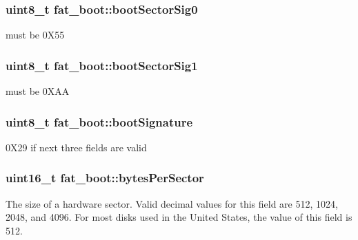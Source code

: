 \subsubsection[{\texorpdfstring{boot\+Sector\+Sig0}{bootSectorSig0}}]{\setlength{\rightskip}{0pt plus 5cm}uint8\+\_\+t fat\+\_\+boot\+::boot\+Sector\+Sig0}\hypertarget{structfat__boot_a7951b888af4f357b84dd40af2ef7f29d}{}\label{structfat__boot_a7951b888af4f357b84dd40af2ef7f29d}
must be 0\+X55 
\subsubsection[{\texorpdfstring{boot\+Sector\+Sig1}{bootSectorSig1}}]{\setlength{\rightskip}{0pt plus 5cm}uint8\+\_\+t fat\+\_\+boot\+::boot\+Sector\+Sig1}\hypertarget{structfat__boot_afe8f58668ff594bb2022ce7c06b7726c}{}\label{structfat__boot_afe8f58668ff594bb2022ce7c06b7726c}
must be 0\+X\+AA 
\subsubsection[{\texorpdfstring{boot\+Signature}{bootSignature}}]{\setlength{\rightskip}{0pt plus 5cm}uint8\+\_\+t fat\+\_\+boot\+::boot\+Signature}\hypertarget{structfat__boot_a712dc388c530e91e4a692e7102d6bdc8}{}\label{structfat__boot_a712dc388c530e91e4a692e7102d6bdc8}
0\+X29 if next three fields are valid 
\subsubsection[{\texorpdfstring{bytes\+Per\+Sector}{bytesPerSector}}]{\setlength{\rightskip}{0pt plus 5cm}uint16\+\_\+t fat\+\_\+boot\+::bytes\+Per\+Sector}\hypertarget{structfat__boot_a60b2461f8ebf0ad295a95094e1bd7d65}{}\label{structfat__boot_a60b2461f8ebf0ad295a95094e1bd7d65}
The size of a hardware sector. Valid decimal values for this field are 512, 1024, 2048, and 4096. For most disks used in the United States, the value of this field is 512. 
